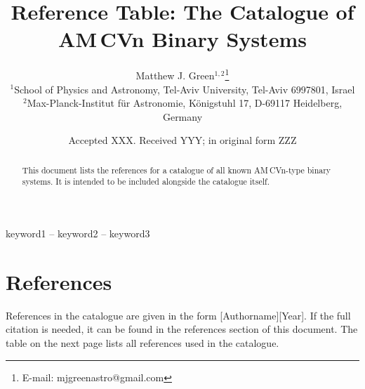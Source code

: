 \documentclass[fleqn,usenatbib]{mnras}
\title[AM\,CVn-type Binary Systems]{Reference Table: The Catalogue of AM\,CVn Binary Systems}
\author[Matthew J. Green et al.]{
Matthew J. Green$^{1,2}$\thanks{E-mail: mjgreenastro@gmail.com}
\\
$^{1}$School of Physics and Astronomy, Tel-Aviv University, Tel-Aviv 6997801, Israel\\
$^{2}$Max-Planck-Institut für Astronomie, Königstuhl 17, D-69117 Heidelberg, Germany\\
}
\date{Accepted XXX. Received YYY; in original form ZZZ}
\begin{document}
\label{firstpage}
\pagerange{\pageref{firstpage}--\pageref{lastpage}}
\maketitle

\begin{abstract}
This document lists the references for a catalogue of all known AM\,CVn-type binary systems. It is intended to be included alongside the catalogue itself.
\end{abstract}

\begin{keywords}
keyword1 -- keyword2 -- keyword3
\end{keywords}






\section{References}

References in the catalogue are given in the form [Authorname][Year]. 
If the full citation is needed, it can be found in the references section of this document.
The table on the next page lists all references used in the catalogue.
\end{document}
